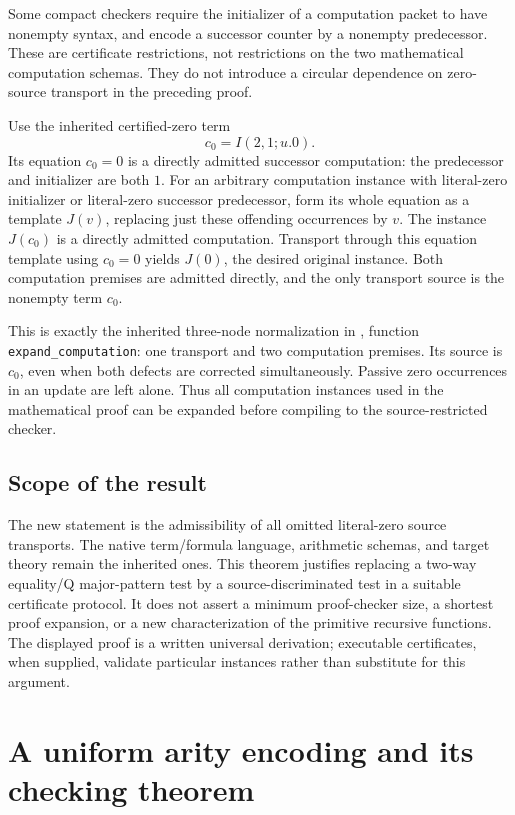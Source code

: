 \documentclass[11pt,letterpaper]{article}
\theoremstyle{definition}
\theoremstyle{remark}
\begin{document}
Some compact checkers require the initializer of a computation packet
to have nonempty syntax, and encode a successor counter by a nonempty
predecessor. These are certificate restrictions, not restrictions
on the two mathematical computation schemas. They do not introduce
a circular dependence on zero-source transport in the preceding proof.

Use the inherited certified-zero term
\[
                         c_0=I(2,1;u.0).
\]
Its equation $c_0=0$ is a directly admitted successor computation:
the predecessor and initializer are both $1$. For an arbitrary
computation instance with literal-zero initializer or literal-zero
successor predecessor, form its whole equation as a template $J(v)$,
replacing just these offending occurrences by $v$. The instance
$J(c_0)$ is a directly admitted computation. Transport through this
equation template using $c_0=0$ yields $J(0)$, the desired original
instance. Both computation premises are admitted directly, and the
only transport source is the nonempty term $c_0$.

This is exactly the inherited three-node normalization in
, function
\texttt{expand\_computation}: one transport and two computation
premises. Its source is $c_0$, even when both defects are corrected
simultaneously. Passive zero occurrences in an update are left alone.
Thus all computation instances used in the mathematical proof can
be expanded before compiling to the source-restricted checker.

\subsection{Scope of the result}

The new statement is the admissibility of all omitted literal-zero
source transports. The native term/formula language, arithmetic
schemas, and target theory remain the inherited ones. This theorem
justifies replacing a two-way equality/Q major-pattern test by a
source-discriminated test in a suitable certificate protocol. It
does not assert a minimum proof-checker size, a shortest proof
expansion, or a new characterization of the primitive recursive
functions. The displayed proof is a written universal derivation;
executable certificates, when supplied, validate particular
instances rather than substitute for this argument.

\section{A uniform arity encoding and its checking theorem}
\label{sec:arity-checker}
\end{document}
